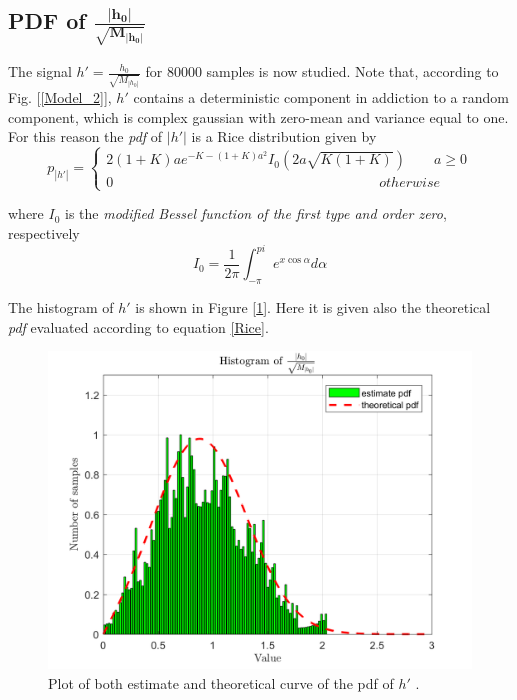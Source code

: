 \documentclass[a4paper, 12pt]{report}
\begin{document}
\clearpage
\subsection*{PDF of $\mathbf{\frac{|h_0|}{\sqrt{M_{|h_0|}}}}$}
The signal $h' = \frac{h_0}{\sqrt{M_{|h_0|}}} $ for 80000 samples is now studied. Note that, according to Fig. [\ref{Model_2}], $h'$ contains a deterministic component in addiction to a random component, which is complex gaussian with zero-mean and variance equal to one. For this reason the \textit{pdf} of $|h'|$ is a Rice distribution given by
\begin{equation}\label{Rice}
p_{|h'|} = \begin{cases*}
			2(1+K)ae^{-K-(1+K)a^2}I_0(2a\sqrt{K(1+K)}) \quad\quad a\ge0 \\
			0 \quad\quad\quad\quad\quad\quad\quad\quad\quad\quad\quad\quad\quad\quad\quad\quad\quad\quad\quad otherwise
\end{cases*}
\end{equation}

where $I_0$ is the \textit{modified Bessel function of the first type and order zero}, respectively
\begin{equation*}
I_0 = \frac{1}{2\pi}\int_{-\pi}^{pi}e^{x \cos \alpha}d\alpha
\end{equation*}

The histogram of $h'$ is shown in Figure [\ref{hist}]. Here it is given also the theoretical \textit{pdf} evaluated according to equation \ref{Rice}.

\begin{figure}[H]
	\centering
	\includegraphics[width=14cm]{images/hist}
	\caption{Plot of both estimate and theoretical curve of the pdf of $h'$ .}\label{hist}
\end{figure}
\end{document}
